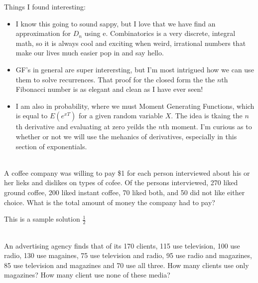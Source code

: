 \documentclass[12pt,letterpaper,boxed]{hmcpset}
\begin{document}

Things I found interesting:
\begin{itemize}
\item I know this going to sound sappy, but I love that we have find an approximation for $D
_n$ using e. Combinatorics is a very discrete, integral math, so it is always cool and exciting when weird, irrational numbers that make our lives much easier pop in and say hello.
\item GF's in general are super interersting, but I'm most intrigued how we can use them to solve recurrences. That proof for the closed form the the $n$th Fibonacci number is as elegant and clean as I have ever seen!
\item I am also in probability, where we must Moment Generating Functions, which is equal to $E(e^{xT})$ for a given random variable $X$. The idea is tkaing the $n$th derivative and evaluating at zero yeilds the $n$th moment. I'm curious as to whether or not we will use the mehanics of derivatives, especially in this section of exponentials.
\end{itemize}

\begin{problem}[Shahriari 8.1.1][20]\\
A coffee company was willing to pay \$1 for each person interviewed about his or her lieks and dislikes on types of cofee. Of the persons interviewed, 270 liked ground coffee, 200 liked instant coffee, 70 liked both, and 50 did not like either choice. What is the total amount of money the company had to pay?
\end{problem}

\begin{solution}
This is a sample solution $\frac{1}{2}$
\end{solution}

\begin{problem}[Shahriari 8.1.3][20]\\
An advertising agency finds that of its 170 clients, 115 use television, 100 use radio, 130 use magaines, 75 use television and radio, 95 use radio and magazines, 85 use television and magazines and 70 use all three. How many clients use only magazines? How many client use none of these media?
\end{problem}
\end{document}
